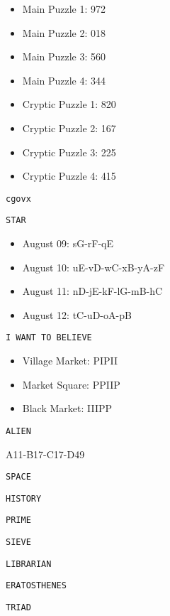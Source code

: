 
\begin{itemize}
\item Main Puzzle 1: 972
\item Main Puzzle 2: 018
\item Main Puzzle 3: 560
\item Main Puzzle 4: 344
\item Cryptic Puzzle 1: 820
\item Cryptic Puzzle 2: 167
\item Cryptic Puzzle 3: 225
\item Cryptic Puzzle 4: 415
\end{itemize}


\texttt{cgovx}


\texttt{STAR}


\begin{itemize}
\item August 09: sG-rF-qE 
\item August 10: uE-vD-wC-xB-yA-zF
\item August 11: nD-jE-kF-lG-mB-hC
\item August 12: tC-uD-oA-pB
\end{itemize}


\texttt{I WANT TO BELIEVE}


\begin{itemize}
\item Village Market: PIPII
\item Market Square: PPIIP 
\item Black Market: IIIPP
\end{itemize}


\texttt{ALIEN}


A11-B17-C17-D49


\texttt{SPACE}


\texttt{HISTORY}


\texttt{PRIME}


\texttt{SIEVE}


\texttt{LIBRARIAN}


\texttt{ERATOSTHENES}


\texttt{TRIAD}
